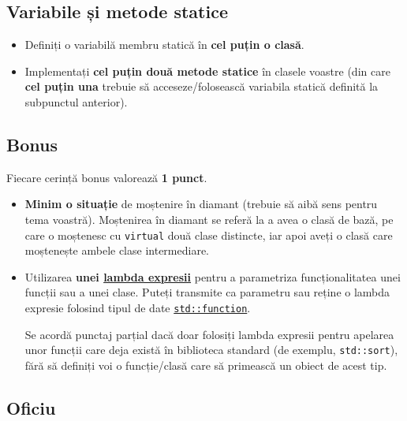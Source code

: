 \subsection*{Variabile și metode statice}

\begin{itemize}
    \item Definiți o variabilă membru statică în \textbf{cel puțin o clasă}.

    \item Implementați \textbf{cel puțin două metode statice} în clasele voastre (din care \textbf{cel puțin una} trebuie să acceseze/folosească variabila statică definită la subpunctul anterior).
\end{itemize}

\subsection*{Bonus}

Fiecare cerință bonus valorează \textbf{1 punct}.

\begin{itemize}
    \item \textbf{Minim o situație} de moștenire în diamant (trebuie să aibă sens pentru tema voastră). Moștenirea în diamant se referă la a avea o clasă de bază, pe care o moștenesc cu \texttt{virtual} două clase distincte, iar apoi aveți o clasă care moștenește ambele clase intermediare.

    \item Utilizarea \textbf{unei \href{https://learn.microsoft.com/en-us/cpp/cpp/lambda-expressions-in-cpp?view=msvc-170}{lambda expresii}} pentru a parametriza funcționalitatea unei funcții sau a unei clase. Puteți transmite ca parametru sau reține o lambda expresie folosind tipul de date \href{https://en.cppreference.com/w/cpp/utility/functional/function}{\texttt{std::function}}.

    Se acordă punctaj parțial dacă doar folosiți lambda expresii pentru apelarea unor funcții care deja există în biblioteca standard (de exemplu, \texttt{std::sort}), fără să definiți voi o funcție/clasă care să primească un obiect de acest tip. 
\end{itemize}

\subsection*{Oficiu}

